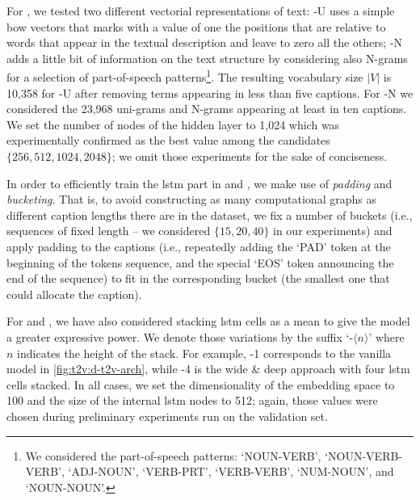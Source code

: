 For \sparsettv{}, we tested two different vectorial representations of text: \sparsettv{}\textsc{-U} uses a simple \acrlong{bow} vectors that marks with a value of one the positions that are relative to words that appear in the textual description and leave to zero all the others; \sparsettv{}\textsc{-N} adds a little bit of information on the text structure by considering also N-grams for a selection of part-of-speech patterns\footnote{We considered the part-of-speech patterns: `NOUN-VERB', `NOUN-VERB-VERB', `ADJ-NOUN', `VERB-PRT', `VERB-VERB', `NUM-NOUN', and `NOUN-NOUN'.}.
The resulting vocabulary size $|V|$ is 10,358 for \sparsettv{}\textsc{-U} after removing terms appearing in less than five captions.
For \sparsettv{}\textsc{-N} we considered the 23,968 uni-grams and N-grams appearing at least in ten captions.
We set the number of nodes of the hidden layer to 1,024 which was experimentally confirmed as the best value among the candidates $\{ 256, 512, 1024, 2048 \}$;
we omit those experiments for the sake of conciseness.

In order to efficiently train the \gls{lstm} part in \densettv{} and \widedeepttv{}, we make use of \emph{padding} and \emph{bucketing}.
That is, to avoid constructing as many computational graphs as different caption lengths there are in the dataset, we fix a number of buckets (i.e.,  sequences of fixed length -- we considered $\{15, 20, 40\}$ in our experiments) and apply padding to the captions (i.e.,  repeatedly adding the `PAD' token at the beginning of the tokens sequence, and the special `EOS' token announcing the end of the sequence) to fit in the corresponding bucket (the smallest one that could allocate the caption).

For \densettv{} and \widedeepttv{}, we have also considered stacking \gls{lstm} cells as a mean to give the model a greater expressive power.
We denote those variations by the suffix `-$\langle n\rangle$' where $n$ indicates the height of the stack.
For example, \densettv{}-1 corresponds to the vanilla model in \ref{fig:t2v:d-t2v-arch}, while \widedeepttv{}-4 is the wide \& deep approach with four \gls{lstm} cells stacked.
In all cases, we set the dimensionality of the embedding space to 100 and the size of the internal \gls{lstm} nodes to 512;
again, those values were chosen during preliminary experiments run on the validation set.

